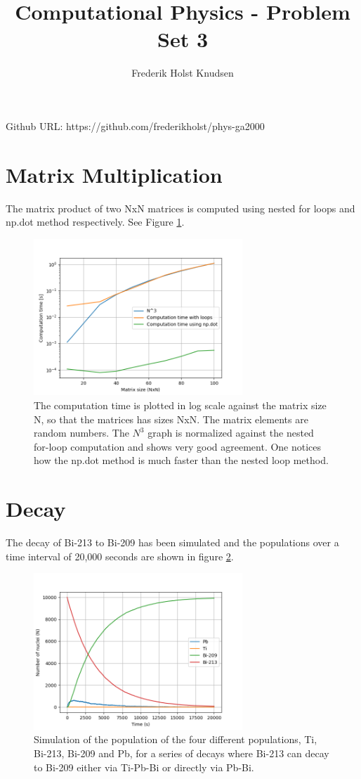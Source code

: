 \documentclass[11pt]{article}
\title{Computational Physics -  Problem Set 3}
\author{Frederik Holst Knudsen}
\begin{document}
\maketitle
Github URL: https://github.com/frederikholst/phys-ga2000
\section{Matrix Multiplication}
The matrix product of two NxN matrices is computed using nested for loops and np.dot method respectively. See Figure \ref*{MM}.

\begin{figure}[!htbp]
    \centering
    \includegraphics[width=0.7\textwidth]{loops_comp.png}
    \caption{The computation time is plotted in log scale against the matrix size N, so that the matrices has sizes NxN. The matrix elements are random numbers. The $N^3$ graph is normalized against the nested for-loop computation and shows very good agreement. One notices how the np.dot method is much faster than the nested loop method.}
    \label{MM}
\end{figure}


\section{Decay}
The decay of Bi-213 to Bi-209 has been simulated and the populations over a time interval of 20,000 seconds are shown in figure \ref{dec}.
\begin{figure}[!htbp]
    \centering
    \includegraphics[width=0.7\textwidth]{Decay.png}
    \caption{Simulation of the population of the four different populations, Ti, Bi-213, Bi-209 and Pb, for a series of decays where Bi-213 can decay to Bi-209 either via Ti-Pb-Bi or directly via Pb-Bi.}
    \label{dec}
\end{figure}
\end{document}

